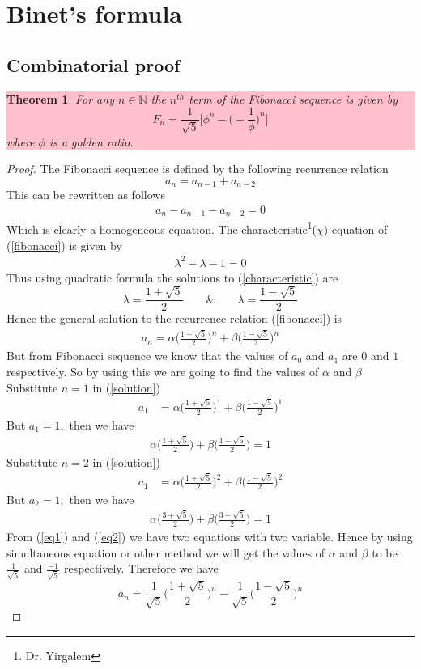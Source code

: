 \documentclass[paper=a4, fontsize=11pt,twoside]{scrartcl}		%
\newtheorem{thm}{Theorem}[section]
\theoremstyle{definition}
\theoremstyle{remark}
\begin{document}
\section{Binet's formula}

\subsection{Combinatorial proof}
\colorbox{pink}{\parbox{\textwidth}{
\begin{thm}
For any $n\in \mathbb{N}$ the $n^{th}$ term of the Fibonacci sequence is given by
$$F_n=\frac{1}{\sqrt{5}}\biggl[\phi^n-\biggl(-\frac{1}{\phi}\biggl)^n \biggl]$$
where $\phi$ is a golden ratio.
\end{thm}}}
\begin{proof}
The Fibonacci sequence is defined by the following recurrence relation
$$ a_n=a_{n-1}+a_{n-2}$$
This can be rewritten as follows
\begin{align}\label{fibonacci}
 a_n-a_{n-1}-a_{n-2}=0
\end{align}
Which is clearly a homogeneous equation. The characteristic\footnote{Dr. Yirgalem}($\chi$) equation of (\ref{fibonacci}) is given by
\begin{align}\label{characteristic}
\lambda^2-\lambda-1=0
\end{align}
Thus using quadratic formula the solutions to (\ref{characteristic}) are
$$\lambda=\frac{1+\sqrt{5}}{2} \qquad \& \qquad \lambda=\frac{1-\sqrt{5}}{2}$$
Hence the general solution to the recurrence relation (\ref{fibonacci}) is
\begin{align}\label{solution}
a_n=\alpha \biggl( \frac{1+\sqrt{5}}{2}\biggl)^n +\beta\biggl( \frac{1-\sqrt{5}}{2}\biggl)^n
\end{align}
But from Fibonacci sequence we know that the values of $a_0$ and $a_1$ are $0$ and $1$ respectively. So by using this we are going to find the values of $\alpha$ and $\beta$\\
Substitute $n=1$ in (\ref{solution})
\begin{align*}
a_1 &=\alpha \biggl( \frac{1+\sqrt{5}}{2}\biggl)^1 +\beta\biggl( \frac{1-\sqrt{5}}{2}\biggl)^1
\end{align*}
But $a_1=1,$ then we have
\begin{align}\label{eq1}
\alpha \biggl( \frac{1+\sqrt{5}}{2}\biggl) +\beta\biggl( \frac{1-\sqrt{5}}{2}\biggl)=1
\end{align}
Substitute $n=2$ in (\ref{solution})
\begin{align*}
a_1 &=\alpha \biggl( \frac{1+\sqrt{5}}{2}\biggl)^2 +\beta\biggl( \frac{1-\sqrt{5}}{2}\biggl)^2
\end{align*}
But $a_2=1,$ then we have
\begin{align}\label{eq2}
\alpha \biggl( \frac{3+\sqrt{5}}{2}\biggl) +\beta\biggl( \frac{3-\sqrt{5}}{2}\biggl)=1
\end{align}
From (\ref{eq1}) and (\ref{eq2}) we have two equations with two variable. Hence by using simultaneous equation or other method we will get the values of $\alpha$ and $\beta$ to be $\frac{1}{\sqrt{5}}$ and $\frac{-1}{\sqrt{5}}$ respectively. Therefore we have
$$
a_n=\frac{1}{\sqrt{5}} \biggl( \frac{1+\sqrt{5}}{2}\biggl)^n -\frac{1}{\sqrt{5}}\biggl( \frac{1-\sqrt{5}}{2}\biggl)^n
$$
\end{proof}
\end{document}
